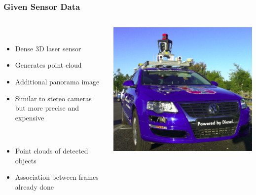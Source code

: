 \begin{frame}
  \frametitle{Given Sensor Data}

  \begin{columns}
  \begin{column}{0.6\textwidth}
  \begin{description}[]
  \item[Sensor] \hfill \\
  \begin{itemize}
  \item Dense 3D laser sensor
  \item Generates point cloud
  \item Additional panorama image
  \item Similar to stereo cameras\\
        but more precise and expensive
  \end{itemize}
  \pause
  \item[Given for us] \hfill \\
  \begin{itemize}
  \item Point clouds of detected objects
  \item Association between frames already done
  \end{itemize}
  \end{description}
  \end{column}
  \begin{column}{0.4\textwidth}
  \includegraphics[width=\textwidth]{../img/lidar}\\

\end{column}
\end{columns}
\end{frame}
